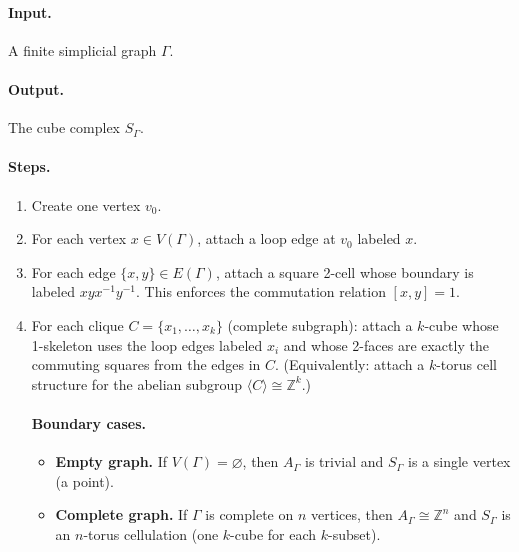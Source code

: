 \documentclass[11pt]{article}
\theoremstyle{definition}
\theoremstyle{plain}
\theoremstyle{remark}
\begin{document}
\paragraph{Input.} A finite simplicial graph $\Gamma$.
\paragraph{Output.} The cube complex $S_\Gamma$.

\paragraph{Steps.}
\begin{enumerate}[leftmargin=2.2em]
\item Create one vertex $v_0$.
\item For each vertex $x\in V(\Gamma)$, attach a loop edge at $v_0$ labeled $x$.
\item For each edge $\{x,y\}\in E(\Gamma)$, attach a square 2-cell whose boundary is labeled $xyx^{-1}y^{-1}$.
This enforces the commutation relation $[x,y]=1$.
\item For each clique $C=\{x_1,\dots,x_k\}$ (complete subgraph):
attach a $k$-cube whose 1-skeleton uses the loop edges labeled $x_i$ and whose 2-faces are exactly the commuting squares from the edges in $C$.
(Equivalently: attach a $k$-torus cell structure for the abelian subgroup $\langle C\rangle\cong\mathbb Z^k$.)


\paragraph{Boundary cases.}
\begin{itemize}[leftmargin=2em]
\item \textbf{Empty graph.} If $V(\Gamma)=\varnothing$, then $A_\Gamma$ is trivial and $S_\Gamma$ is a single vertex (a point).
\item \textbf{Complete graph.} If $\Gamma$ is complete on $n$ vertices, then $A_\Gamma\cong \mathbb Z^n$ and $S_\Gamma$ is an $n$-torus cellulation (one $k$-cube for each $k$-subset).
\end{itemize}


\end{enumerate}
\end{document}
